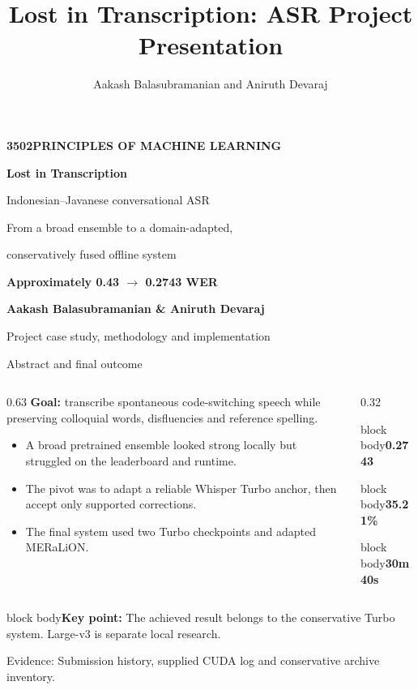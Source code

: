 \documentclass[aspectratio=169,11pt]{beamer}
\title{Lost in Transcription: ASR Project Presentation}
\author{Aakash Balasubramanian and Aniruth Devaraj}
\newcommand{\takeaway}[1]{\vfill\begin{beamercolorbox}[sep=2mm,wd=\linewidth]{block body}\small\textbf{Key point:} #1\end{beamercolorbox}}
\newcommand{\evidence}[1]{\vspace{1mm}\par{\tiny\color{slate}Evidence: #1\par}}
\newcommand{\metric}[2]{\begin{beamercolorbox}[sep=3mm,center,wd=\linewidth]{block body}{\LARGE\bfseries\color{teal}#1}\par\vspace{1mm}{\small #2}\end{beamercolorbox}}
\begin{document}
\begin{frame}[plain]
\vspace{5mm}
{\color{teal}\small\bfseries 3502\quad PRINCIPLES OF MACHINE LEARNING}\par
\vspace{7mm}
{\fontsize{29}{33}\selectfont\bfseries Lost in Transcription}\par
\vspace{3mm}
{\Large Indonesian--Javanese conversational ASR}\par
\vspace{5mm}
{\normalsize From a broad ensemble to a domain-adapted,\par conservatively fused offline system}\par
\vspace{6mm}
{\color{teal}\Large\bfseries Approximately 0.43 $\longrightarrow$ 0.2743 WER}\par
\vfill
{\normalsize\bfseries Aakash Balasubramanian \& Aniruth Devaraj}\par
\vspace{2mm}
{\small\color{slate}Project case study, methodology and implementation}\par
\vspace{5mm}
\end{frame}

\begin{frame}{Abstract and final outcome}
\begin{columns}[T]
\begin{column}{0.63\textwidth}
\textbf{Goal:} transcribe spontaneous code-switching speech while preserving colloquial words, disfluencies and reference spelling.
\vspace{3mm}
\begin{itemize}\item A broad pretrained ensemble looked strong locally but struggled on the leaderboard and runtime.
\item The pivot was to adapt a reliable Whisper Turbo anchor, then accept only supported corrections.
\item The final system used two Turbo checkpoints and adapted MERaLiON.
\end{itemize}
\end{column}
\begin{column}{0.32\textwidth}
\metric{0.2743}{Reported final competition WER}
\vspace{3mm}\metric{35.21\%}{Relative reduction: 0.4234 to 0.2743}
\vspace{3mm}\metric{30m 40s}{Measured CUDA inference}
\end{column}
\end{columns}
\takeaway{The achieved result belongs to the conservative Turbo system. Large-v3 is separate local research.}
\evidence{Submission history, supplied CUDA log and conservative archive inventory.}
\end{frame}
\end{document}
